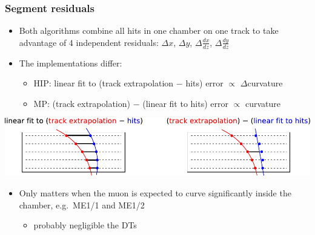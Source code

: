 \documentclass[compress]{beamer}
\begin{document}
\begin{frame}
\frametitle{Segment residuals}

\begin{itemize}
\item Both algorithms combine all hits in one chamber on one track to take advantage of 4 independent residuals: $\Delta x$, $\Delta y$, $\Delta \frac{dx}{dz}$, $\Delta \frac{dy}{dz}$
\item The implementations differ:
\begin{itemize}\setlength{\itemsep}{0.1 cm}\scriptsize
\item HIP: linear fit to (track extrapolation $-$ hits) \hfill error $\propto$ $\Delta$curvature
\item MP: (track extrapolation) $-$ (linear fit to hits) \hfill error $\propto$ curvature
\end{itemize}
\end{itemize}

\vfill \includegraphics[width=\linewidth]{segment_residuals.pdf}

\vfill \begin{itemize}
\item Only matters when the muon is expected to curve significantly inside the chamber, e.g.\ ME1/1 and ME1/2
\begin{itemize}
\item probably negligible the DTs
\end{itemize}
\end{itemize}
\end{frame}
\end{document}
